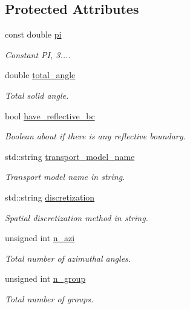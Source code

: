 \subsection*{Protected Attributes}
\begin{DoxyCompactItemize}
\item 
const double \hyperlink{class_a_q_base_a002ce18f617db787616e60fba67899a9}{pi}
\begin{DoxyCompactList}\small\item\em Constant PI, 3.... \end{DoxyCompactList}\item 
double \hyperlink{class_a_q_base_a930e1dbffe2c99f42b76ea3164905ac1}{total\+\_\+angle}
\begin{DoxyCompactList}\small\item\em Total solid angle. \end{DoxyCompactList}\item 
bool \hyperlink{class_a_q_base_a8afa1e0da5bbb4846e495178e165b5b5}{have\+\_\+reflective\+\_\+bc}
\begin{DoxyCompactList}\small\item\em Boolean about if there is any reflective boundary. \end{DoxyCompactList}\item 
std\+::string \hyperlink{class_a_q_base_a14d94b7179306f35228b90fd5f42c65a}{transport\+\_\+model\+\_\+name}
\begin{DoxyCompactList}\small\item\em Transport model name in string. \end{DoxyCompactList}\item 
std\+::string \hyperlink{class_a_q_base_a6c454af11008e235340a7b8e31a02114}{discretization}
\begin{DoxyCompactList}\small\item\em Spatial discretization method in string. \end{DoxyCompactList}\item 
unsigned int \hyperlink{class_a_q_base_aaff6bd848436445d267c1a121a93e4ea}{n\+\_\+azi}
\begin{DoxyCompactList}\small\item\em Total number of azimuthal angles. \end{DoxyCompactList}\item 
unsigned int \hyperlink{class_a_q_base_a07b0839db1844f879f3d9c7d7014fb7f}{n\+\_\+group}
\begin{DoxyCompactList}\small\item\em Total number of groups. \end{DoxyCompactList}\item 

\end{DoxyCompactItemize}
